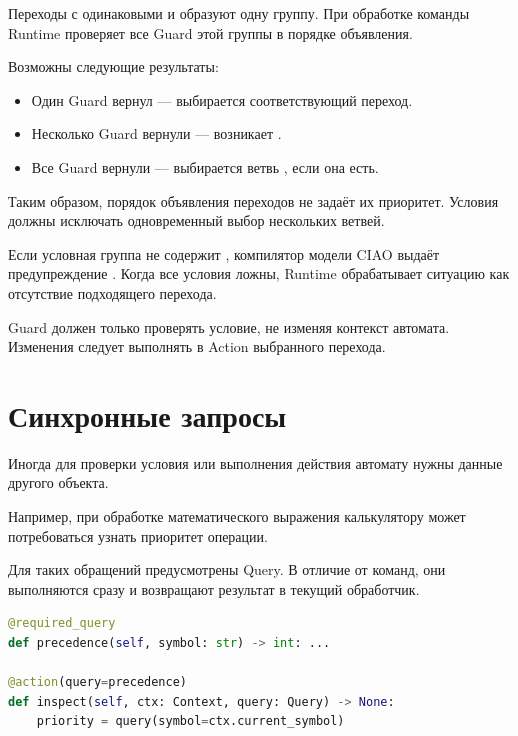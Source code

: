 Переходы с одинаковыми  и 
образуют одну группу. При обработке команды Runtime
проверяет все Guard этой группы в порядке объявления.

Возможны следующие результаты:

\begin{itemize}
  \item Один Guard вернул  ---
    выбирается соответствующий переход.
  \item Несколько Guard вернули  ---
    возникает .
  \item Все Guard вернули  ---
    выбирается ветвь , если она есть.
\end{itemize}

Таким образом, порядок объявления переходов
не задаёт их приоритет. Условия должны исключать
одновременный выбор нескольких ветвей.

Если условная группа не содержит ,
компилятор модели CIAO выдаёт предупреждение
. Когда все условия
ложны, Runtime обрабатывает ситуацию как отсутствие
подходящего перехода.

\begin{importantbox}
Guard должен только проверять условие, не изменяя
контекст автомата. Изменения следует выполнять
в Action выбранного перехода.
\end{importantbox}

\section{Синхронные запросы}

Иногда для проверки условия или выполнения действия
автомату нужны данные другого объекта.

Например, при обработке математического выражения
калькулятору может потребоваться узнать приоритет
операции.

Для таких обращений предусмотрены Query.
В отличие от команд, они выполняются сразу
и возвращают результат в текущий обработчик.

\begin{lstlisting}[language=Python,numbers=none]
@required_query
def precedence(self, symbol: str) -> int: ...

@action(query=precedence)
def inspect(self, ctx: Context, query: Query) -> None:
    priority = query(symbol=ctx.current_symbol)
\end{lstlisting}

